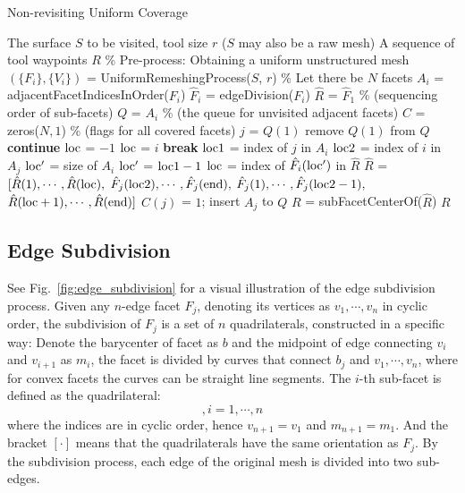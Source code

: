 \documentclass[lettersize,journal]{IEEEtran}
\begin{document}
\begin{algorithm}[t]
    \caption{Non-revisiting Uniform Coverage}\label{alg:NUC}
    \begin{algorithmic}[1]
        \Require The surface $S$ to be visited, tool size $r$
\Statex \quad($S$ may also be a raw mesh)%
        \Ensure A sequence of tool waypoints $R$
\State \% Pre-process: Obtaining a uniform unstructured mesh
\State $(\{F_i\}, \{V_i\})$ = UniformRemeshingProcess($S$, $r$)
\State \% Let there be $N$ facets 
\State $A_i$ = adjacentFacetIndicesInOrder($F_i$)
\EndFor
{}
\State $\hat{F}_i$ = edgeDivision($F_i$)
\EndFor
\State $\hat{R}$ = $\hat{F}_1$ \% (sequencing order of sub-facets)
\State $Q$ = $A_i$ \% (the queue for unvisited adjacent facets)
\State $C$ = zeros($N, 1$) \% (flags for all covered facets)
\State $j$ = $Q(1)$
\State remove $Q(1)$ from $Q$
\State \textbf{continue}
\EndIf
\State ${\rm loc}$ = $-1$
\State ${\rm loc}$ = $i$
\State \textbf{break}
\EndIf
\EndFor
\State ${\rm loc1}$ = index of $j$ in $A_i$
\State ${\rm loc2}$ = index of $i$ in $A_j$
\State ${\rm loc'}$ = size of $A_i$
\Else
\State ${\rm loc'}$ = ${\rm loc1} - 1$
\EndIf
\State ${\rm loc}$ = index of $\hat{F}_i({\rm loc'})$ in $\hat{R}$
\State $\hat{R}$ = $[\hat{R}(1), \cdots, \hat{R}({\rm loc}), $
\Statex \qquad\qquad $\hat{F}_j({\rm loc2}), \cdots, \hat{F}_j({\rm end}), $
\Statex \qquad\qquad $\hat{F}_j({\rm 1}), \cdots, \hat{F}_j({\rm loc2}-1), $
\Statex \qquad\qquad $\hat{R}({\rm loc}+1), \cdots, \hat{R}({\rm end})]$
\State $C(j)$ = $1$;
\State insert $A_j$ to $Q$
\EndWhile
\State $R$ = subFacetCenterOf($\hat{R}$)
\State \Return $R$
    \end{algorithmic}  
\end{algorithm}

\subsection{Edge Subdivision}\label{section_subdivision}
See Fig.~\ref{fig:edge_subdivision} for a visual illustration of the edge subdivision process. 
Given any $n$-edge facet $F_j$, denoting its vertices as $v_1, \cdots, v_n$ in cyclic order, the subdivision of $F_j$ is a set of $n$ quadrilaterals, constructed in a specific way:
Denote the barycenter of facet as $b$ and the midpoint of edge connecting $v_i$ and $v_{i+1}$ as $m_i$, the facet is divided by curves that connect $b_j$ and $v_1, \cdots, v_n$, where for convex facets the curves can be straight line segments. 
The $i$-th sub-facet is defined as the quadrilateral: 
\begin{equation}
[b_j, m_i, v_{i+1}, m_{i+1}], i = 1, \cdots, n
\end{equation}
where the indices are in cyclic order, hence $v_{n+1} = v_1$ and $m_{n+1} = m_1$. 
And the bracket $[\cdot]$ means that the quadrilaterals have the same orientation as $F_j$. 
By the subdivision process, each edge of the original mesh is divided into two sub-edges. 
\end{document}
